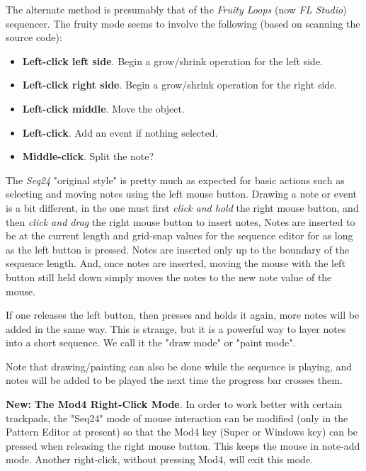    The alternate method is presumably that of the \textsl{Fruity Loops}
   (now \textsl{FL Studio}) sequencer.  The fruity mode seems to involve the
   following (based on scanning the source code):
   
   \begin{itemize}
      \item \textbf{Left-click left side}.
         Begin a grow/shrink operation for the left side.
      \item \textbf{Left-click right side}.
         Begin a grow/shrink operation for the right side.
      \item \textbf{Left-click middle}.
         Move the object.
      \item \textbf{Left-click}.
         Add an event if nothing selected.
      \item \textbf{Middle-click}.
         Split the note?
   \end{itemize}

   The \textsl{Seq24} "original style" is pretty much as expected for basic
   actions such as selecting and moving notes using the left mouse button.
   Drawing a note or event is a bit different, in the one must first
   \textsl{click and hold} the right mouse button, and then
   \textsl{click and drag} the right mouse button to insert notes,
   Notes are inserted to be at the current length and grid-snap values for
   the sequence editor for as long as the left button is pressed.
   Notes are inserted only up to the boundary of the sequence length.
   And, once notes are inserted, moving the mouse with the left button still
   held down simply moves the notes to the new note value of the mouse.

   If one releases the left button, then presses and holds it again,
   more notes will be added in the same way.
   This is strange, but it is a powerful way to layer notes into a short
   sequence.
   We call it the   "draw mode" or
     "paint mode".

   Note that drawing/painting can also be done while the sequence is playing,
   and notes will be added to be played the next time the progress bar crosses
   them.
   
   \textbf{New:}
   \label{new_mod4_mode}
   \textbf{The Mod4 Right-Click Mode}.
   In order to work better with certain trackpads, the
   "Seq24" mode of mouse interaction can be modified (only in the
   Pattern Editor at present) so that the Mod4 key (Super or Windows key)
   can be pressed when releasing the right mouse button.
   This keeps the mouse in note-add mode.
   Another right-click, without pressing Mod4, will exit this mode.

